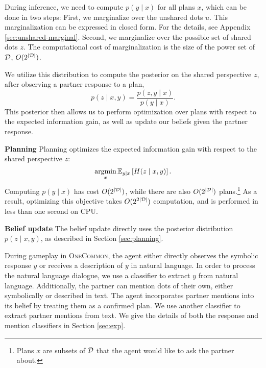 \documentclass[11pt]{article}
\newcommand{\daniel}[1]{{{\textcolor{red}{(Daniel: #1)}}}}
\begin{document}
During inference, we need to compute $p(y \mid x)$ for all plans $x$,
which can be done in two steps: First, we marginalize over the unshared dots $u$.
This marginalization can be expressed in closed form.
For the details, see Appendix \ref{sec:unshared-marginal}.
Second, we marginalize over the possible set of shared dots $z$.
The computational cost of marginalization is the size of the power set of $\mathcal{D}$, $O(2^{|\mathcal{D}|})$.


We utilize this distribution to compute the posterior on the shared perspective $z$, after observing a partner response to a plan,
$$ p(z \mid x,y) = \frac{ p(z, y \mid x)}{p(y \mid x)}.$$
This posterior then allows us to perform optimization over plans with respect to the expected information gain, as well as update our beliefs given the partner response.


\noindent \textbf{Planning} Planning optimizes the expected information gain with respect to the shared perspective $z$:
$$\operatorname*{argmin}_x \mathbb{E}_{y\mid x}\left[H(z \mid x,y)\right].$$
Computing $p(y \mid x)$ has cost $O(2^{|\mathcal{D}|})$,
while there are also $O(2^{|\mathcal{D}|})$ plans.\footnote{
Plans $x$ are subsets of $\mathcal{D}$ that the agent would like to ask the partner about.
}
As a result, optimizing this objective takes $O(2^{2|\mathcal{D}|})$ computation, and is performed in less than one second on CPU.%

\textbf{Belief update}
The belief update directly uses the posterior distribution $p(z \mid x,y)$, as described in Section \ref{sec:planning}.

During gameplay in \textsc{OneCommon}, the agent either directly observes the symbolic response $y$ or receives a description of $y$ in natural language.
In order to process the natural language dialogue,
we use a classifier to extract $y$ from natural language. 
Additionally, the partner can mention dots of their own, either symbolically or described in text.
The agent incorporates partner mentions into its belief by treating them as a confirmed plan.
We use another classifier to extract partner mentions from text.
We give the details of both the response and mention classifiers in Section \ref{sec:exp}.
\end{document}
